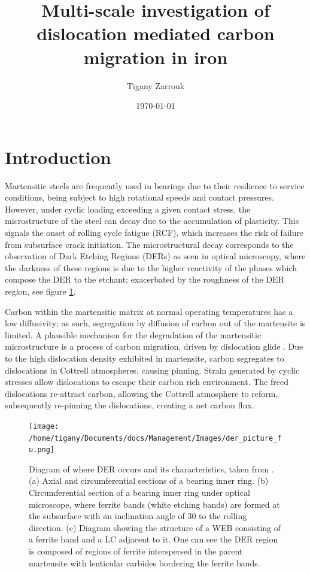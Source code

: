 \documentclass[a4paper,11pt]{article}
\author{Tigany Zarrouk}
\date{\today}
\title{Multi-scale investigation of dislocation mediated carbon migration in iron}
\begin{document}
\maketitle
\tableofcontents


\section{Introduction}
\label{sec:org00f9435}

Martensitic steels are frequently used in bearings due to their resilience to service conditions,
being subject to high rotational speeds and contact pressures. However, under cyclic loading
exceeding a given contact stress, the microstructure of the steel can decay due to the accumulation
of plasticity. This signals the onset of rolling cycle fatigue (RCF), which increases the risk of
failure from subsurface crack initiation. The microstructural decay corresponds to the observation
of Dark Etching Regions (DERs) as seen in optical microscopy, where the darkness of these regions is due
to the higher reactivity of the phases which compose the DER to the etchant; exacerbated by
the roughness of the DER region, see figure \ref{fuderpicture}.

Carbon within the martensitic matrix at normal operating temperatures has a low diffusivity; as
such, segregation by diffusion of carbon out of the martensite is limited. A plausible mechanism
for the degradation of the martensitic microstructure is a process of carbon migration, driven by
dislocation glide
\cite{Fu2017,fu17_strain_induc_marten_decay_bearin,Warhadpande1_2013,Warhadpande2013,voskamp97_state_resid_stres_induc_by,Swahn1976}. Due
to the high dislocation density exhibited in martensite, carbon segregates to dislocations in
Cottrell atmospheres, causing pinning. Strain generated by cyclic stresses allow dislocations to
escape their carbon rich environment. The freed dislocations re-attract carbon, allowing the
Cottrell atmosphere to reform, subsequently re-pinning the dislocations, creating a net carbon
flux.


\begin{figure}[htbp]
\centering
\texttt{[image: /home/tigany/Documents/docs/Management/Images/der\_picture\_fu.png]}
\caption{Diagram of where DER occurs and its characteristics, taken from \cite{Fu2017}. (a) Axial and circumferential sections of a bearing inner ring. (b) Circumferential section of a bearing inner ring under optical microscope, where ferrite bands (white etching bands) are formed at the subsurface with an inclination angle of 30\textdegree{} to the rolling direction. (c) Diagram showing the structure of a WEB consisting of a ferrite band and a LC adjacent to it. One can see the DER region is composed of regions of ferrite interspersed in the parent martensite with lenticular carbides bordering the ferrite bands. \label{fuderpicture}}
\end{figure}
\end{document}
